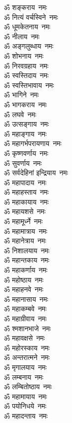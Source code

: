 \begin{multicols}{2}
\begin{flushleft}
ॐ शङ्कराय~नमः\hfill{}\\
ॐ नित्यं वर्चस्विने~नमः\\
ॐ धूमकेतनाय~नमः\\
ॐ नीलाय~नमः\\
ॐ अङ्गलुब्धाय~नमः\\
ॐ शोभनाय~नमः\\
ॐ निरवग्रहाय~नमः\\
ॐ स्वस्तिदाय~नमः\\
ॐ स्वस्तिभावाय~नमः\\
ॐ भागिने~नमः\\
ॐ भागकराय~नमः\hfill{}\\
ॐ लघवे~नमः\\
ॐ उत्सङ्गाय~नमः\\
ॐ महाङ्गाय~नमः\\
ॐ महागर्भपरायणाय~नमः\\
ॐ कृष्णवर्णाय~नमः\\
ॐ सुवर्णाय~नमः\\
ॐ सर्वदेहिनां इन्द्रियाय~नमः\\
ॐ महापादाय~नमः\\
ॐ महाहस्ताय~नमः\\
ॐ महाकायाय~नमः\hfill{}\\
ॐ महायशसे~नमः\\
ॐ महामूर्ध्ने~नमः\\
ॐ महामात्राय~नमः\\
ॐ महानेत्राय~नमः\\
ॐ निशालयाय~नमः\\
ॐ महान्तकाय~नमः\\
ॐ महाकर्णाय~नमः\\
ॐ महोष्ठाय~नमः\\
ॐ महाहनवे~नमः\\
ॐ महानासाय~नमः\hfill{}\\
ॐ महाकम्बवे~नमः\\
ॐ महाग्रीवाय~नमः\\
ॐ श्मशानभाजे~नमः\\
ॐ महावक्षसे~नमः\\
ॐ महोरस्काय~नमः\\
ॐ अन्तरात्मने~नमः\\
ॐ मृगालयाय~नमः\\
ॐ लम्बनाय~नमः\\
ॐ लम्बितोष्ठाय~नमः\\
ॐ महामायाय~नमः\hfill{}\\
ॐ पयोनिधये~नमः\\
ॐ महादन्ताय~नमः\\

\end{flushleft}
\end{multicols}
